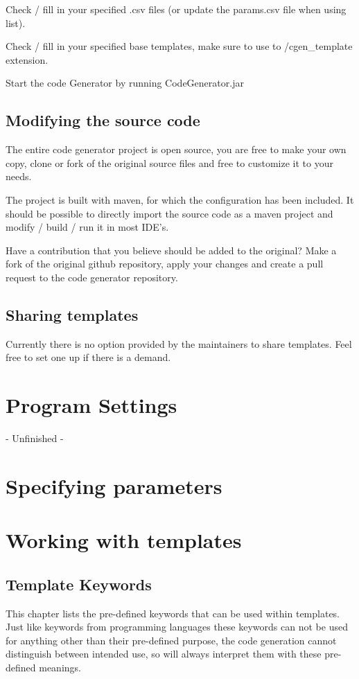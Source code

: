 \documentclass{settings/TU_Delft_Report}
\begin{document}
\vsp Check / fill in your specified .csv files (or update the params.csv file when using list).

\vsp Check / fill in your specified base templates, make sure to use to /cgen\_template extension.

\vsp Start the code Generator by running CodeGenerator.jar

\section{Modifying the source code}
The entire code generator project is open source, you are free to make your own copy, clone or fork of the original source files and free to customize it to your needs.\vsp

The project is built with maven, for which the configuration has been included. It should be possible to directly import the source code as a maven project and modify / build / run it in most IDE's.\vsp

Have a contribution that you believe should be added to the original? Make a fork of the original github repository, apply your changes and create a pull request to the code generator repository.

\section{Sharing templates}
Currently there is no option provided by the maintainers to share templates. Feel free to set one up if there is a demand.

\chapter{Program Settings}
- Unfinished -

\chapter{Specifying parameters}

\chapter{Working with templates}

\section{Template Keywords}
This chapter lists the pre-defined keywords that can be used within templates. Just like keywords from programming languages these keywords can not be used for anything other than their pre-defined purpose, the code generation cannot distinguish between intended use, so will always interpret them with these pre-defined meanings.
\end{document}
